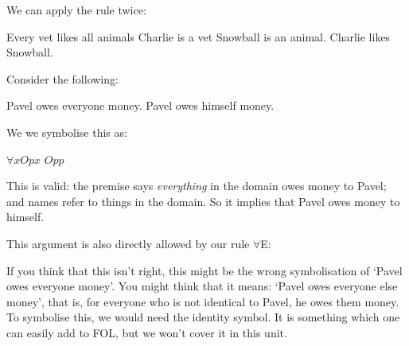We can apply the rule twice:
\begin{earg}
	\prem Every vet likes all animals
	\prem Charlie is a vet 
	\prem Snowball is an animal.
	\conc Charlie likes Snowball.
\end{earg}

\begin{fitchproof}
\end{fitchproof}



Consider the following:
\begin{earg}
\prem Pavel owes everyone money.
\conc Pavel owes himself money.
\end{earg}
We we symbolise this as:
\begin{earg}
\prem $\forall x Opx$
\conc $Opp$
\end{earg}
This is valid: the premise says \emph{everything} in the domain owes money to Pavel; and names refer to things in the domain. So it implies that Pavel owes money to himself. 

This argument is also directly allowed by our rule $\forall$E:
\begin{fitchproof}
	 
\end{fitchproof}

If you think that this isn't right, this might be the wrong symbolisation of `Pavel owes everyone money'. You might think that it means: `Pavel owes everyone else money', that is, for everyone who is not identical to Pavel, he owes them money. To symbolise this, we would need the identity symbol. It is something which one can easily add to FOL, but we won't cover it in this unit. 






